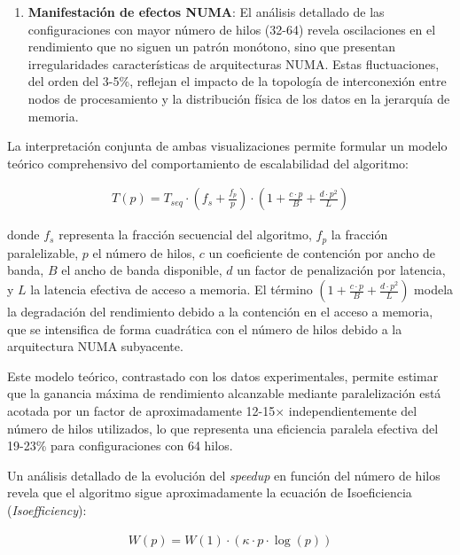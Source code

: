 \begin{enumerate}
            \item \textbf{Manifestación de efectos NUMA}: El análisis detallado de las configuraciones con mayor número de hilos (32-64) revela oscilaciones en el rendimiento que no siguen un patrón monótono, sino que presentan irregularidades características de arquitecturas NUMA. Estas fluctuaciones, del orden del 3-5\%, reflejan el impacto de la topología de interconexión entre nodos de procesamiento y la distribución física de los datos en la jerarquía de memoria.
            
        \end{enumerate}
            
        La interpretación conjunta de ambas visualizaciones permite formular un modelo teórico comprehensivo del comportamiento de escalabilidad del algoritmo:
                
        \begin{align}
            T(p) = T_{seq} \cdot (f_s + \frac{f_p}{p}) \cdot (1 + \frac{c \cdot p}{B} + \frac{d \cdot p^2}{L})
        \end{align}
        
        donde $f_s$ representa la fracción secuencial del algoritmo, $f_p$ la fracción paralelizable, $p$ el número de hilos, $c$ un coeficiente de contención por ancho de banda, $B$ el ancho de banda disponible, $d$ un factor de penalización por latencia, y $L$ la latencia efectiva de acceso a memoria. El término $(1 + \frac{c \cdot p}{B} + \frac{d \cdot p^2}{L})$ modela la degradación del rendimiento debido a la contención en el acceso a memoria, que se intensifica de forma cuadrática con el número de hilos debido a la arquitectura NUMA subyacente.
        
        Este modelo teórico, contrastado con los datos experimentales, permite estimar que la ganancia máxima de rendimiento alcanzable mediante paralelización está acotada por un factor de aproximadamente 12-15$\times$ independientemente del número de hilos utilizados, lo que representa una eficiencia paralela efectiva del 19-23\% para configuraciones con 64 hilos.
        
        Un análisis detallado de la evolución del \textit{speedup} en función del número de hilos revela que el algoritmo sigue aproximadamente la ecuación de Isoeficiencia (\textit{Isoefficiency}):
        
        \begin{align}
            W(p) = W(1) \cdot (\kappa \cdot p \cdot \log(p))
        \end{align}
        
